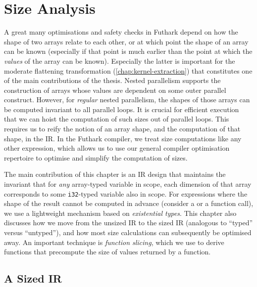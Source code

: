 \chapter{Size Analysis}
\label{chap:size-analysis}

A great many optimisations and safety checks in Futhark depend on how
the shape of two arrays relate to each other, or at which point the
shape of an array can be known (especially if that point is much
earlier than the point at which the \textit{values} of the array can
be known).  Especially the latter is important for the moderate
flattening transformation (\cref{chap:kernel-extraction}) that
constitutes one of the main contributions of the thesis.  Nested
parallelism supports the construction of arrays whose values are
dependent on some outer parallel construct.  However, for
\textit{regular} nested parallelism, the shapes of those arrays can be
computed invariant to all parallel loops.  It is crucial for efficient
execution that we can hoist the computation of such sizes out of
parallel loops.  This requires us to reify the notion of an array
shape, and the computation of that shape, in the IR.  In the Futhark
compiler, we treat size computations like any other expression, which
allows us to use our general compiler optimisation repertoire to
optimise and simplify the computation of sizes.

The main contribution of this chapter is an IR design that maintains
the invariant that for \textit{any} array-typed variable in scope,
each dimension of that array corresponds to some \lstinline{i32}-typed
variable also in scope.  For expressions where the shape of the result
cannot be computed in advance (consider a  or a function
call), we use a lightweight mechanism based on \textit{existential
  types}.  This chapter also discusses how we move from the unsized IR
to the sized IR (analogous to ``typed'' versus ``untyped''), and how
most size calculations can subsequently be optimised away.  An
important technique is \textit{function slicing}, which we use to
derive functions that precompute the size of values returned by a
function.

\section{A Sized IR}

